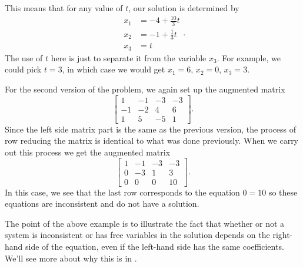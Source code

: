 \documentclass{ximera}
\begin{document}
\begin{exampleSol}
\begin{equation*}
    \end{equation*}
    This means that for any value of $t$, our solution is determined by
    \begin{equation*}
        \begin{split}
            x_1 &=  -4 + \frac{10}{3}t \\
            x_2 &= -1 + \frac{1}{3}t  \\
            x_3 &= t
        \end{split}.
    \end{equation*}
    The use of $t$ here is just to separate it from the variable $x_3$. For example, we could pick $t=3$, in which case we would get $x_1 = 6$, $x_2 = 0$, $x_3 = 3$. 
    
    For the second version of the problem, we again set up the augmented matrix
    \begin{equation*}
        \left[ 
            \begin{array}{ccc|c}
                1 & -1 & -3 & -3 \\
                -1 & -2 & 4 & 6 \\
                1 & 5 & -5 & 1
            \end{array}
        \right].
    \end{equation*}
    Since the left side matrix part is the same as the previous version, the process of row reducing the matrix is identical to what was done previously. When we carry out this process we get the augmented matrix
    \begin{equation*}
        \left[ 
            \begin{array}{ccc|c}
                1 & -1 & -3 & -3 \\
                0 & -3 & 1 & 3 \\
                0 & 0 & 0 & 10
            \end{array}
        \right].
    \end{equation*}
    In this case, we see that the last row corresponds to the equation $0 = 10$ so these equations are inconsistent and do not have a solution.
\end{exampleSol}
The point of the above example is to illustrate the fact that whether or not a system is inconsistent or has free variables in the solution depends on the right-hand side of the equation, even if the left-hand side has the same coefficients. We'll see more about why this is in .
\end{document}
